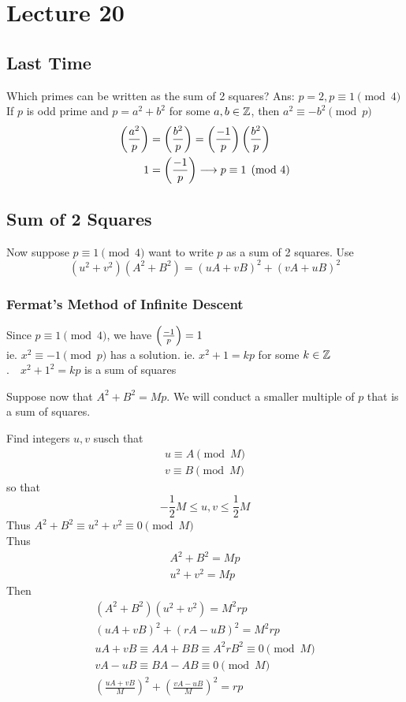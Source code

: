 \chapter{Lecture 20}
\date{November 7, 2024}

\section{Last Time}
    Which primes can be written as the sum of 2 squares?
    Ans: $p=2, p\equiv 1\pmod{4}$ \\
    If $p$ is odd prime and $p=a^2 + b^2$ for some $a,b\in\mathbb{Z}$, 
    then $a^2\equiv -b^2\pmod{p}$
    \begin{align*}
        \left( \frac{a^2}{p} \right)  &= \left( \frac{b^2}{p} \right)  = \left( \frac{-1}{p} \right) \left( \frac{b^2}{p} \right)  \\
        1 &= \left( \frac{-1}{p} \right) \longrightarrow p\equiv 1\pmod{4}
    \end{align*}

\section{Sum of 2 Squares}
    Now suppose $p\equiv 1\pmod{4}$ want to write $p$ as a sum of 2 squares.
    Use 
    \[
        (u^2+v^2)(A^2+B^2) = (uA+vB)^2 + (vA+uB)^2
    \]

    \subsection{Fermat's Method of Infinite Descent}
    Since $p\equiv 1\pmod{4}$, we have $\left( \frac{-1}{p} \right)  = 1$ \\
    ie. $x^2\equiv -1\pmod{p}$ has a solution.
    ie. $x^2+1=kp$ for some $k\in\mathbb{Z}$ \\
    .$\quad x^2+1^2=kp$ is a sum of squares

    Suppose now that $A^2+B^2=Mp$. We will conduct a smaller multiple of $p$ 
    that is a sum of squares.

    Find integers $u,v$ susch that
    \begin{align*}
        u\equiv A\pmod{M} \\
        v\equiv B\pmod{M}
    \end{align*}
    so that 
    \[
        -\frac{1}{2}M \le u,v \le \frac{1}{2}M
    \]
    Thus $A^2+B^2\equiv u^2+v^2\equiv 0\pmod{M}$ \\
    Thus 
    \begin{align*}
        A^2+B^2 = Mp \\
        u^2 + v^2 = Mp
    \end{align*}
    Then 
    \begin{align*}
        (A^2+B^2)(u^2+v^2) = M^2rp \\
        (uA+vB)^2+(rA-uB)^2 = M^2rp \\
        uA+vB\equiv AA + BB \equiv A^2rB^2\equiv 0\pmod{M} \\
        vA-uB\equiv BA - AB\equiv 0\pmod{M} \\
        (\frac{uA+vB}{M})^2 + (\frac{vA-uB}{M})^2 = rp 
    \end{align*}

